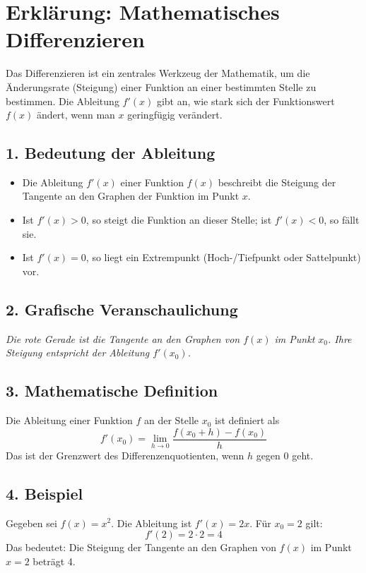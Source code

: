 
\section*{Erklärung: Mathematisches Differenzieren}

Das Differenzieren ist ein zentrales Werkzeug der Mathematik, um die Änderungsrate (Steigung) einer Funktion an einer bestimmten Stelle zu bestimmen. Die Ableitung $f'(x)$ gibt an, wie stark sich der Funktionswert $f(x)$ ändert, wenn man $x$ geringfügig verändert.

\subsection*{1. Bedeutung der Ableitung}
\begin{itemize}
    \item Die Ableitung $f'(x)$ einer Funktion $f(x)$ beschreibt die Steigung der Tangente an den Graphen der Funktion im Punkt $x$.
    \item Ist $f'(x) > 0$, so steigt die Funktion an dieser Stelle; ist $f'(x) < 0$, so fällt sie.
    \item Ist $f'(x) = 0$, so liegt ein Extrempunkt (Hoch-/Tiefpunkt oder Sattelpunkt) vor.
\end{itemize}


\subsection*{2. Grafische Veranschaulichung}
\begin{center}
\end{center}

\textit{Die rote Gerade ist die Tangente an den Graphen von $f(x)$ im Punkt $x_0$. Ihre Steigung entspricht der Ableitung $f'(x_0)$.}

\subsection*{3. Mathematische Definition}
Die Ableitung einer Funktion $f$ an der Stelle $x_0$ ist definiert als
\[
  f'(x_0) = \lim_{h \to 0} \frac{f(x_0 + h) - f(x_0)}{h}
\]
Das ist der Grenzwert des Differenzenquotienten, wenn $h$ gegen 0 geht.

\subsection*{4. Beispiel}
Gegeben sei $f(x) = x^2$. Die Ableitung ist $f'(x) = 2x$. Für $x_0 = 2$ gilt:
\[
  f'(2) = 2 \cdot 2 = 4
\]
Das bedeutet: Die Steigung der Tangente an den Graphen von $f(x)$ im Punkt $x=2$ beträgt 4.

